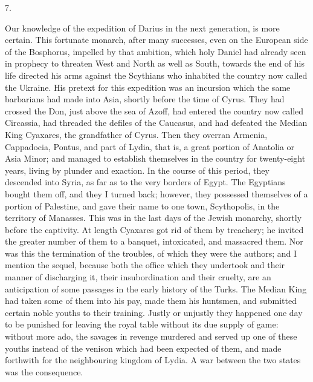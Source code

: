 7.

Our knowledge of the
expedition of Darius in the next generation, is more certain.
This fortunate monarch, after many successes, even on the European
side of the Bosphorus, impelled by that ambition, which holy Daniel
had already seen in prophecy to threaten West and North as well as
South, towards the end of his life directed his arms against the
Scythians who inhabited the country now called the Ukraine. His
pretext for this expedition was an incursion which the same barbarians
had made into Asia, shortly before the time of Cyrus. They had crossed
the Don, just above the sea of Azoff, had entered the country now
called Circassia, had threaded the defiles of the Caucasus, and had
defeated the Median King Cyaxares, the grandfather of Cyrus. Then they
overran Armenia, Cappadocia, Pontus, and part of Lydia, that is, a
great portion of Anatolia or Asia Minor; and managed to establish
themselves in the country for twenty-eight years, living by plunder
and exaction. In the course of this period, they descended into Syria,
as far as to the very borders of Egypt. The Egyptians bought them off,
and they I turned back; however, they possessed themselves of a
portion of Palestine, and gave their name to one town, Scythopolis, in
the territory of Manasses. This was in the last days of the Jewish
monarchy, shortly before the captivity. At length Cyaxares got rid of
them by treachery; he invited the greater number of them to a banquet,
intoxicated, and massacred them. Nor was this the termination of the
troubles, of which they were the authors; and I mention the sequel,
because both the office which they undertook and their manner of
discharging it, their insubordination and their cruelty, are an
anticipation of some passages in the early history of the Turks. The
Median King had taken some of them into his pay, made them his
huntsmen, and submitted certain noble youths to their training.
Justly or unjustly they happened one day to be punished for leaving
the royal table without its due supply of game: without more ado, the
savages in revenge murdered and served up one of these youths instead
of the venison which had been expected of them, and made forthwith for
the neighbouring kingdom of Lydia. A war between the two states was
the consequence.

